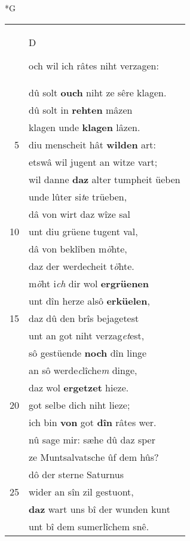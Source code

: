 \documentclass[8pt,a4paper,notitlepage]{article}
\begin{document}
\begin{table}[ht]
\begin{minipage}[t]{0.5\linewidth}
\small
\begin{center}*G
\end{center}
\begin{tabular}{rl}
 & \begin{large}D\end{large}och wil ich râtes niht verzagen:\\ 
 & dû solt \textbf{ouch} niht ze sêre klagen.\\ 
 & dû solt in \textbf{rehten} mâzen\\ 
 & klagen unde \textbf{klagen} lâzen.\\ 
5 & diu menscheit hât \textbf{wilden} art:\\ 
 & etswâ wil jugent an witze vart;\\ 
 & wil danne \textbf{daz} alter tumpheit üeben\\ 
 & unde lûter si\textit{t}e trüeben,\\ 
 & dâ von wirt daz wîze sal\\ 
10 & unt diu grüene tugent val,\\ 
 & dâ von beklîben m\textit{ö}hte,\\ 
 & daz der werdecheit t\textit{ö}hte.\\ 
 & m\textit{ö}ht i\textit{ch} dir wol \textbf{ergrüenen}\\ 
 & unt dîn herze alsô \textbf{erküelen},\\ 
15 & daz dû den brîs bejagetest\\ 
 & unt an got niht verzag\textit{et}est,\\ 
 & sô gestüende \textbf{noch} dîn linge\\ 
 & an sô werde\textit{c}lîche\textit{m} dinge,\\ 
 & daz wol \textbf{ergetzet} hieze.\\ 
20 & got selbe dich niht lieze;\\ 
 & ich bin \textbf{von} got \textbf{dîn} râtes wer.\\ 
 & nû sage mir: sæhe dû daz sper\\ 
 & ze Muntsalvatsche ûf dem hûs?\\ 
 & dô der sterne Saturnus\\ 
25 & wider an sîn zil gestuont,\\ 
 & \textbf{daz} wart uns bî der wunden kunt\\ 
 & unt bî dem sumerlîchem snê.\\ 

\end{tabular}
\end{minipage}
\end{table}
\end{document}
